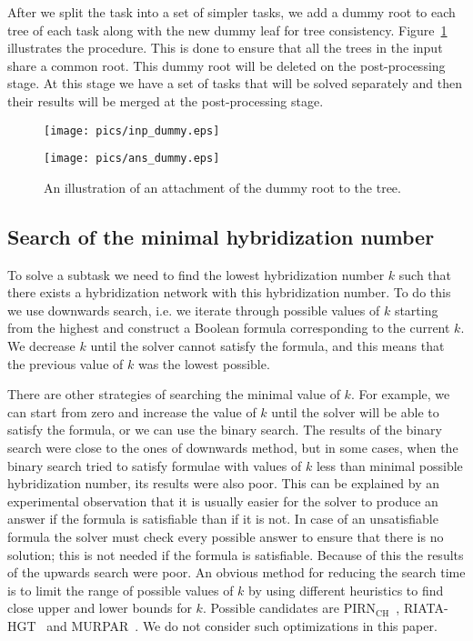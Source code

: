 \documentclass[runningheads, envcountsame, a4paper]{llncs}
\begin{document}
After we split the task into a set of simpler tasks, we add a dummy root to each tree of each task along with 
the new dummy leaf for tree consistency. Figure~\ref{dummy-example} illustrates the procedure. 
This is done to ensure that all the trees in the input share a common root. 
This dummy root will be deleted on the post-processing stage. At this stage we have a set of tasks that will be solved 
separately and then their results will be merged at the post-processing stage.

\begin{figure}[t]
  \centering
  \begin{minipage}[b]{0.39\linewidth}
    \texttt{[image: pics/inp\_dummy.eps]}
  \end{minipage}
  \hfill
  \begin{minipage}[b]{0.59\linewidth}
    \texttt{[image: pics/ans\_dummy.eps]}
  \end{minipage}
  \caption{An illustration of an attachment of the dummy root to the tree.}
  \label{dummy-example}
\end{figure}

\subsection{Search of the minimal hybridization number}

To solve a subtask we need to find the lowest hybridization number $k$ such that there exists a hybridization 
network with this hybridization number. To do this we use downwards search, i.e. we iterate through possible values of $k$ starting from the highest 
and construct a Boolean formula corresponding to the current $k$. 
We decrease $k$ until the solver cannot satisfy the formula, and this means that the previous value of $k$ was the 
lowest possible.

There are other strategies of searching the minimal value of $k$. For example, we can start from 
zero and increase the value of $k$ until the solver will be able to satisfy the formula, or we can use the binary search. 
The results of the binary search were close to the ones of downwards method, 
but in some cases, when the binary search tried to satisfy formulae with values of $k$ less than minimal possible hybridization number, 
its results were also poor. 
This can be explained by an experimental observation that it is usually easier for the solver to produce an answer if the formula is satisfiable than if it is not. 
In case of an unsatisfiable formula the solver must check every possible answer to ensure that there is no solution; this is not needed if the 
formula is satisfiable. Because of this the results of the upwards search were poor. An obvious method 
for reducing the search time is to limit the range of possible values of $k$ by using different heuristics to find close upper and lower bounds for $k$. 
Possible candidates are PIRN$\mathrm{_{CH}}$~\cite{wu2013algorithm}, RIATA-HGT~\cite{nakhleh2005riata} and MURPAR~\cite{park2012murpar}. We do not consider such optimizations in this paper.
\end{document}
